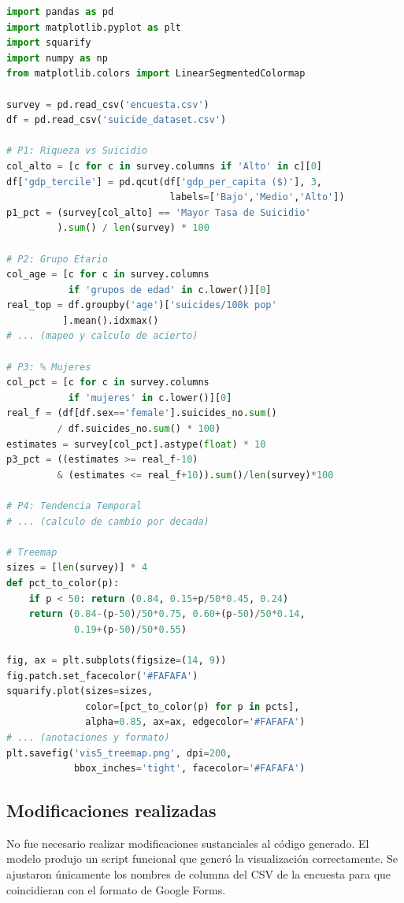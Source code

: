 \documentclass[12pt, letterpaper]{article}
\begin{document}
\begin{lstlisting}[basicstyle=\small\ttfamily, breaklines=true, frame=single, language=Python]
import pandas as pd
import matplotlib.pyplot as plt
import squarify
import numpy as np
from matplotlib.colors import LinearSegmentedColormap

survey = pd.read_csv('encuesta.csv')
df = pd.read_csv('suicide_dataset.csv')

# P1: Riqueza vs Suicidio
col_alto = [c for c in survey.columns if 'Alto' in c][0]
df['gdp_tercile'] = pd.qcut(df['gdp_per_capita ($)'], 3,
                             labels=['Bajo','Medio','Alto'])
p1_pct = (survey[col_alto] == 'Mayor Tasa de Suicidio'
         ).sum() / len(survey) * 100

# P2: Grupo Etario
col_age = [c for c in survey.columns
           if 'grupos de edad' in c.lower()][0]
real_top = df.groupby('age')['suicides/100k pop'
          ].mean().idxmax()
# ... (mapeo y calculo de acierto)

# P3: % Mujeres
col_pct = [c for c in survey.columns
           if 'mujeres' in c.lower()][0]
real_f = (df[df.sex=='female'].suicides_no.sum()
         / df.suicides_no.sum() * 100)
estimates = survey[col_pct].astype(float) * 10
p3_pct = ((estimates >= real_f-10)
         & (estimates <= real_f+10)).sum()/len(survey)*100

# P4: Tendencia Temporal
# ... (calculo de cambio por decada)

# Treemap
sizes = [len(survey)] * 4
def pct_to_color(p):
    if p < 50: return (0.84, 0.15+p/50*0.45, 0.24)
    return (0.84-(p-50)/50*0.75, 0.60+(p-50)/50*0.14,
            0.19+(p-50)/50*0.55)

fig, ax = plt.subplots(figsize=(14, 9))
fig.patch.set_facecolor('#FAFAFA')
squarify.plot(sizes=sizes,
              color=[pct_to_color(p) for p in pcts],
              alpha=0.85, ax=ax, edgecolor='#FAFAFA')
# ... (anotaciones y formato)
plt.savefig('vis5_treemap.png', dpi=200,
            bbox_inches='tight', facecolor='#FAFAFA')
\end{lstlisting}

\subsection{Modificaciones realizadas}

No fue necesario realizar modificaciones sustanciales al código generado. El modelo produjo un script funcional que generó la visualización correctamente. Se ajustaron únicamente los nombres de columna del CSV de la encuesta para que coincidieran con el formato de Google Forms.
\end{document}
